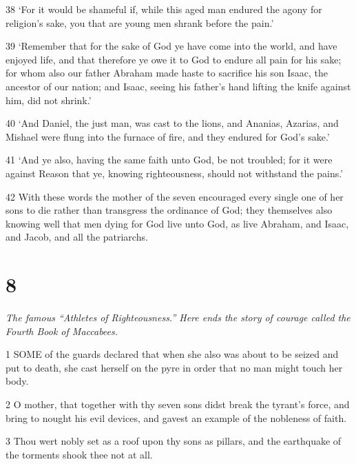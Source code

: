 \par 38 ‘For it would be shameful if, while this aged man endured the agony for religion's sake, you that are young men shrank before the pain.’

\par 39 ‘Remember that for the sake of God ye have come into the world, and have enjoyed life, and that therefore ye owe it to God to endure all pain for his sake; for whom also our father Abraham made haste to sacrifice his son Isaac, the ancestor of our nation; and Isaac, seeing his father's hand lifting the knife against him, did not shrink.’

\par 40 ‘And Daniel, the just man, was cast to the lions, and Ananias, Azarias, and Mishael were flung into the furnace of fire, and they endured for God's sake.’

\par 41 ‘And ye also, having the same faith unto God, be not troubled; for it were against Reason that ye, knowing righteousness, should not withstand the pains.’

\par 42 With these words the mother of the seven encouraged every single one of her sons to die rather than transgress the ordinance of God; they themselves also knowing well that men dying for God live unto God, as live Abraham, and Isaac, and Jacob, and all the patriarchs.



\chapter{8}

\par \textit{The famous “Athletes of Righteousness.” Here ends the story of courage called the Fourth Book of Maccabees.}

\par 1 SOME of the guards declared that when she also was about to be seized and put to death, she cast herself on the pyre in order that no man might touch her body.

\par 2 O mother, that together with thy seven sons didst break the tyrant's force, and bring to nought his evil devices, and gavest an example of the nobleness of faith.

\par 3 Thou wert nobly set as a roof upon thy sons as pillars, and the earthquake of the torments shook thee not at all.

